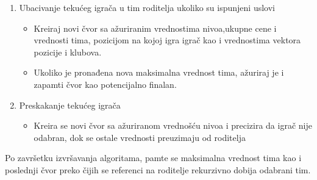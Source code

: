 \documentclass[a4paper]{article}
\begin{document}
\begin{enumerate}
  \item Ubacivanje tekućeg igrača u tim roditelja ukoliko su ispunjeni uslovi 
  \vspace{1mm}
  \begin{itemize}
	\item Kreiraj novi čvor sa ažuriranim vrednostima nivoa,ukupne cene i vrednosti tima, pozicijom na kojoj igra igrač kao i vrednostima vektora pozicije i klubova.  
	\vspace{1mm}
	\item Ukoliko je pronađena nova maksimalna vrednost tima, ažuriraj je i zapamti čvor kao potencijalno finalan.

	
  \end{itemize}
  \vspace{1mm}
  \item Preskakanje tekućeg igrača 
  \vspace{1mm}
  \begin{itemize}
	\item Kreira se novi čvor sa ažuriranom vrednošću nivoa i precizira da igrač nije odabran, dok se ostale vrednosti preuzimaju od roditelja

	
  \end{itemize}
\end{enumerate} 
\vspace{3mm} 

Po završetku izvršavanja algoritama, pamte se maksimalna vrednost tima kao i poslednji čvor preko čijih se referenci na roditelje rekurzivno dobija odabrani tim.





\end{document}
